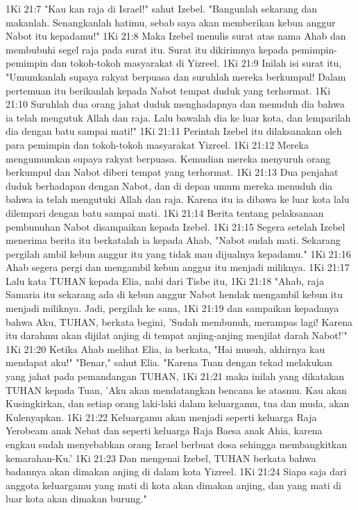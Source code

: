 1Ki 21:7  "Kau kan raja di Israel!" sahut Izebel. "Bangunlah sekarang dan makanlah. Senangkanlah hatimu, sebab saya akan memberikan kebun anggur Nabot itu kepadamu!"
1Ki 21:8  Maka Izebel menulis surat atas nama Ahab dan membubuhi segel raja pada surat itu. Surat itu dikirimnya kepada pemimpin-pemimpin dan tokoh-tokoh masyarakat di Yizreel.
1Ki 21:9  Inilah isi surat itu, "Umumkanlah supaya rakyat berpuasa dan suruhlah mereka berkumpul! Dalam pertemuan itu berikanlah kepada Nabot tempat duduk yang terhormat.
1Ki 21:10  Suruhlah dua orang jahat duduk menghadapnya dan menuduh dia bahwa ia telah mengutuk Allah dan raja. Lalu bawalah dia ke luar kota, dan lemparilah dia dengan batu sampai mati!"
1Ki 21:11  Perintah Izebel itu dilaksanakan oleh para pemimpin dan tokoh-tokoh masyarakat Yizreel.
1Ki 21:12  Mereka mengumumkan supaya rakyat berpuasa. Kemudian mereka menyuruh orang berkumpul dan Nabot diberi tempat yang terhormat.
1Ki 21:13  Dua penjahat duduk berhadapan dengan Nabot, dan di depan umum mereka menuduh dia bahwa ia telah mengutuki Allah dan raja. Karena itu ia dibawa ke luar kota lalu dilempari dengan batu sampai mati.
1Ki 21:14  Berita tentang pelaksanaan pembunuhan Nabot disampaikan kepada Izebel.
1Ki 21:15  Segera setelah Izebel menerima berita itu berkatalah ia kepada Ahab, "Nabot sudah mati. Sekarang pergilah ambil kebun anggur itu yang tidak mau dijualnya kepadamu."
1Ki 21:16  Ahab segera pergi dan mengambil kebun anggur itu menjadi miliknya.
1Ki 21:17  Lalu kata TUHAN kepada Elia, nabi dari Tisbe itu,
1Ki 21:18  "Ahab, raja Samaria itu sekarang ada di kebun anggur Nabot hendak mengambil kebun itu menjadi miliknya. Jadi, pergilah ke sana,
1Ki 21:19  dan sampaikan kepadanya bahwa Aku, TUHAN, berkata begini, 'Sudah membunuh, merampas lagi! Karena itu darahmu akan dijilat anjing di tempat anjing-anjing menjilat darah Nabot!'"
1Ki 21:20  Ketika Ahab melihat Elia, ia berkata, "Hai musuh, akhirnya kau mendapat aku!" "Benar," sahut Elia. "Karena Tuan dengan tekad melakukan yang jahat pada pemandangan TUHAN,
1Ki 21:21  maka inilah yang dikatakan TUHAN kepada Tuan, 'Aku akan mendatangkan bencana ke atasmu. Kau akan Kusingkirkan, dan setiap orang laki-laki dalam keluargamu, tua dan muda, akan Kulenyapkan.
1Ki 21:22  Keluargamu akan menjadi seperti keluarga Raja Yerobeam anak Nebat dan seperti keluarga Raja Baesa anak Ahia, karena engkau sudah menyebabkan orang Israel berbuat dosa sehingga membangkitkan kemarahan-Ku.'
1Ki 21:23  Dan mengenai Izebel, TUHAN berkata bahwa badannya akan dimakan anjing di dalam kota Yizreel.
1Ki 21:24  Siapa saja dari anggota keluargamu yang mati di kota akan dimakan anjing, dan yang mati di luar kota akan dimakan burung."
